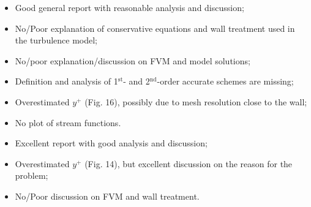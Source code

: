 \documentclass[14pt,twoside]{report}
\newcommand\blankpage{%
    \null
    \thispagestyle{empty}%
    \addtocounter{page}{-1}%
    \newpage}
\begin{document}
\clearpage 



\bigskip


\medskip

  \begin{itemize}
%
     \item Good general report with reasonable analysis and discussion;
     \item No/Poor explanation of conservative equations and wall treatment used in the turbulence model;
     \item No/poor explanation/discussion on FVM and model solutions;
     \item Definition and analysis of 1$^{\text{st}}$- and 2$^{\text{nd}}$-order accurate schemes are missing;
     \item Overestimated $y^{+}$ (Fig. 16), possibly due to mesh resolution close to the wall;
     \item No plot of stream functions.
%
  \end{itemize}%

\clearpage 



\bigskip


\medskip

  \begin{itemize}
%
     \item Excellent report with good analysis and discussion;
     \item Overestimated $y^{+}$ (Fig. 14), but excellent discussion on the reason for the problem;
     \item No/Poor discussion on FVM and wall treatment.
%
  \end{itemize}%

\clearpage 



\bigskip

\end{document}
